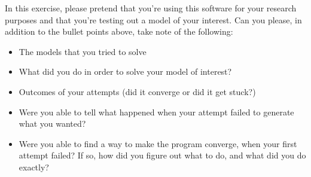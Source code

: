 \documentclass[10pt,a4paper]{article}
\begin{document}
In this exercise, please pretend that you're using this software for your research purposes and that you're testing out a model of your interest. Can you please, in addition to the bullet points above, take note of the following:
\begin{itemize}
\item The models that you tried to solve
\item What did you do in order to solve your model of interest?
\item Outcomes of your attempts (did it converge or did it get stuck?)
\item Were you able to tell what happened when your attempt failed to generate what you wanted?
\item Were you able to find a way to make the program converge, when your first attempt failed? If so, how did you figure out what to do, and what did you do exactly?
\end{itemize}
%
%
%
%
%
%
%
%
\end{document}
